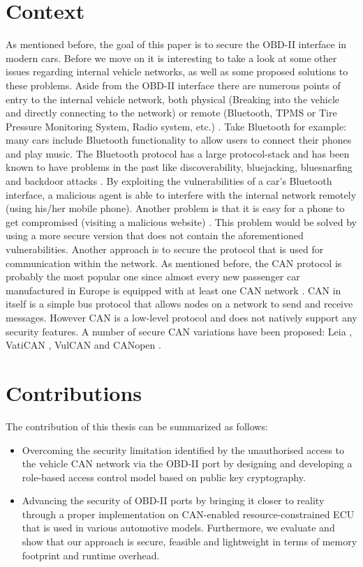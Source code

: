 \section{Context}
As mentioned before, the goal of this paper is to secure the OBD-II interface in modern cars. Before we move on it is interesting to take a look at some other issues regarding internal vehicle networks, as well as some proposed solutions to these problems. Aside from the OBD-II interface there are numerous points of entry to the internal vehicle network, both physical (Breaking into the vehicle and directly connecting to the network) or remote (Bluetooth, TPMS or Tire Pressure Monitoring System, Radio system, etc.) \cite{MillerA}. Take Bluetooth for example: many cars include Bluetooth functionality to allow users to connect their phones and play music. The Bluetooth protocol has a large protocol-stack and has been known to have problems in the past \cite{MillerA} like discoverability, bluejacking, bluesnarfing and backdoor attacks \cite{Bluetooth}. By exploiting the vulnerabilities of a car's Bluetooth interface, a malicious agent is able to interfere with the internal network remotely (using his/her mobile phone). Another problem is that it is easy for a phone to get compromised (visiting a malicious website) \cite{Yadav16}. This problem would be solved by using a more secure version that does not contain the aforementioned vulnerabilities.\newline 
\newline
Another approach is to secure the protocol that is used for communication within the network. As mentioned before, the CAN protocol is probably the most popular one since almost every new passenger car manufactured in Europe is equipped with at least one CAN network \cite{CANhistory}. CAN in itself is a simple bus protocol that allows nodes on a network to send and receive messages. However CAN is a low-level protocol and does not natively support any security features. A number of secure CAN variations have been proposed: Leia \cite{Leia}, VatiCAN \cite{VatiCAN}, VulCAN \cite{VulCAN} and CANopen \cite{Pfeiffer}.

\section{Contributions}
The contribution of this thesis can be summarized as follows:

\begin{itemize}
	\item Overcoming the security limitation identified by the unauthorised access to the vehicle CAN network via the OBD-II port by designing and developing a role-based access control model based on public key cryptography.
	
	\item Advancing the security of OBD-II ports by bringing it closer to reality through a proper implementation on CAN-enabled resource-constrained ECU that is used in various automotive models. Furthermore, we evaluate and show that our approach is secure, feasible and lightweight in terms of memory footprint and runtime overhead.
\end{itemize} 
